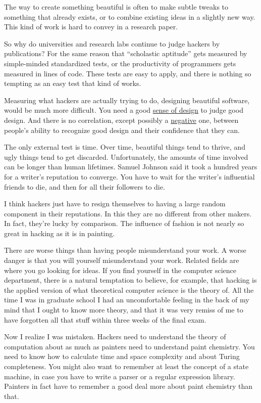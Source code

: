 The way to create something beautiful is often to make subtle tweaks to
something that already exists, or to combine existing ideas in a
slightly new way. This kind of work is hard to convey in a research
paper.

So why do universities and research labs continue to judge hackers by
publications? For the same reason that ``scholastic aptitude'' gets
measured by simple-minded standardized tests, or the productivity of
programmers gets measured in lines of code. These tests are easy to
apply, and there is nothing so tempting as an easy test that kind of
works.

Measuring what hackers are actually trying to do, designing beautiful
software, would be much more difficult. You need a good
\href{taste.html}{sense of design} to judge good design. And there is no
correlation, except possibly a
\href{http://www.apa.org/journals/features/psp7761121.pdf}{negative}
one, between people's ability to recognize good design and their
confidence that they can.

The only external test is time. Over time, beautiful things tend to
thrive, and ugly things tend to get discarded. Unfortunately, the
amounts of time involved can be longer than human lifetimes. Samuel
Johnson said it took a hundred years for a writer's reputation to
converge. You have to wait for the writer's influential friends to die,
and then for all their followers to die.

I think hackers just have to resign themselves to having a large random
component in their reputations. In this they are no different from other
makers. In fact, they're lucky by comparison. The influence of fashion
is not nearly so great in hacking as it is in painting.

There are worse things than having people misunderstand your work. A
worse danger is that you will yourself misunderstand your work. Related
fields are where you go looking for ideas. If you find yourself in the
computer science department, there is a natural temptation to believe,
for example, that hacking is the applied version of what theoretical
computer science is the theory of. All the time I was in graduate school
I had an uncomfortable feeling in the back of my mind that I ought to
know more theory, and that it was very remiss of me to have forgotten
all that stuff within three weeks of the final exam.

Now I realize I was mistaken. Hackers need to understand the theory of
computation about as much as painters need to understand paint
chemistry. You need to know how to calculate time and space complexity
and about Turing completeness. You might also want to remember at least
the concept of a state machine, in case you have to write a parser or a
regular expression library. Painters in fact have to remember a good
deal more about paint chemistry than that.

